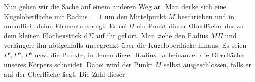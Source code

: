 \par
Nun gehen wir die Sache auf einem anderen Weg an. Man denke sich eine Kugeloberfläche mit Radius $=1$ um den Mittelpunkt $M$ beschrieben und in unendlich kleine Elemente zerlegt. Es sei $\Pi$ ein Punkt dieser Oberfläche, der zu dem kleinen Flächenstück $\mathrm{d}\Sigma$ auf ihr gehört. Man ziehe den Radius $M\Pi$ und verlängere ihn nötigenfalls unbegrenzt über die Kugeloberfläche hinaus. Es seien $P',P'',P''$ usw. die Punkte, in denen dieser Radius nacheinander die Oberfläche unseres Körpers schneidet. Dabei wird der Punkt $M$ selbst ausgeschlossen, falls er auf der Oberfläche liegt. Die Zahl dieser

